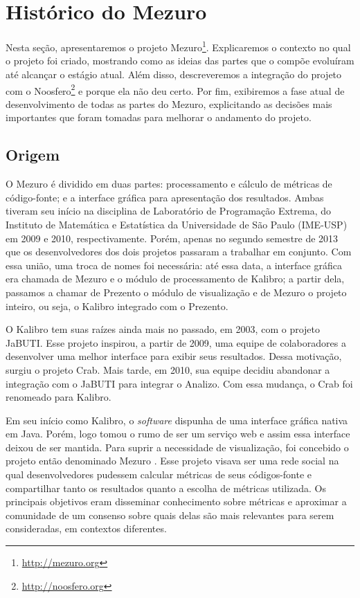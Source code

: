 \documentclass{llncs}
\begin{document}
\section{Histórico do Mezuro}\label{sec:mezuro}
Nesta seção, apresentaremos o projeto Mezuro\footnote{\url{http://mezuro.org}}. Explicaremos o contexto no qual o projeto foi criado, mostrando como as ideias das partes que o compõe evoluíram até alcançar o estágio atual. Além disso, descreveremos a integração do projeto com o Noosfero\footnote{\url{http://noosfero.org}} e porque ela não deu certo. Por fim, exibiremos a fase atual de desenvolvimento de todas as partes do Mezuro, explicitando as decisões mais importantes que foram tomadas para melhorar o andamento do projeto.

  \subsection{Origem}\label{sec:origin}
  O Mezuro é dividido em duas partes: processamento e cálculo de métricas de código-fonte; e a interface gráfica para apresentação dos resultados. Ambas tiveram seu início na disciplina de Laboratório de Programação Extrema, do Instituto de Matemática e Estatística da Universidade de São Paulo (IME-USP) em 2009 e 2010, respectivamente. Porém, apenas no segundo semestre de 2013 que os desenvolvedores dos dois projetos passaram a trabalhar em conjunto. Com essa união, uma troca de nomes foi necessária: até essa data, a interface gráfica era chamada de Mezuro e o módulo de processamento de Kalibro; a partir dela, passamos a chamar de Prezento o módulo de visualização e de Mezuro o projeto inteiro, ou seja, o Kalibro integrado com o Prezento.

  O Kalibro\cite{de2013kalibro} tem suas raízes ainda mais no passado, em 2003, com o projeto JaBUTI\cite{vincenzi2003jabuti}. Esse projeto inspirou, a partir de 2009, uma equipe de colaboradores a desenvolver uma melhor interface para exibir seus resultados. Dessa motivação, surgiu o projeto Crab\cite{meirelles2009crab}. Mais tarde, em 2010, sua equipe decidiu abandonar a integração com o JaBUTI para integrar o Analizo\cite{terceiro2010analizo}. Com essa mudança, o Crab foi renomeado para Kalibro.

  Em seu início como Kalibro, o \textit{software} dispunha de uma interface gráfica nativa em Java. Porém, logo tomou o rumo de ser um serviço web e assim essa interface deixou de ser mantida. Para suprir a necessidade de visualização, foi concebido o projeto então denominado Mezuro \cite{meirelles2013monitoramento}. Esse projeto visava ser uma rede social na qual desenvolvedores pudessem calcular métricas de seus códigos-fonte e compartilhar tanto os resultados quanto a escolha de métricas utilizada. Os principais objetivos eram disseminar conhecimento sobre métricas e aproximar a comunidade de um consenso sobre quais delas são mais relevantes para serem consideradas, em contextos diferentes.
\end{document}
